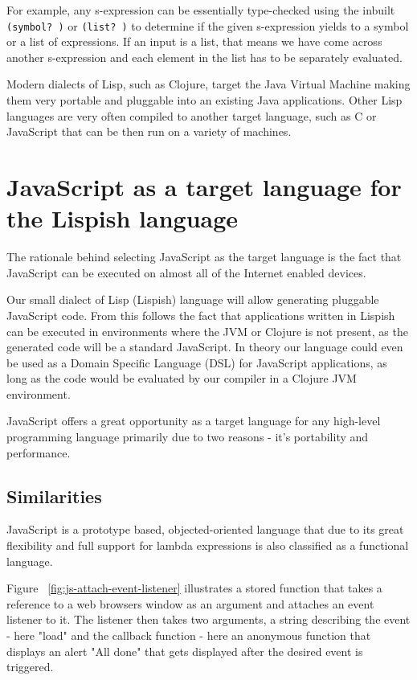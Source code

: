 For example, any s-expression can be essentially type-checked using the inbuilt \texttt{(symbol? )} or \texttt{(list? )} to determine if the given s-expression yields to a symbol or a list of expressions. If an input is a list, that means we have come across another s-expression and each element in the list has to be separately evaluated.

Modern dialects of Lisp, such as Clojure, target the Java Virtual Machine making them very portable and pluggable into an existing Java applications.
Other Lisp languages are very often compiled to another target language, such as C or JavaScript that can be then run on a variety of machines.

\section{JavaScript as a target language for the Lispish language}
The rationale behind selecting JavaScript as the target language is the fact that JavaScript can be executed on almost all of the Internet enabled devices.

Our small dialect of Lisp (Lispish) language will allow generating pluggable JavaScript code.
From this follows the fact that applications written in Lispish can be executed in environments where the JVM or Clojure is not present, as the generated code will be a standard JavaScript.
In theory our language could even be used as a Domain Specific Language (DSL) for JavaScript applications, as long as the code would be evaluated by our compiler in a Clojure JVM environment.

JavaScript offers a great opportunity as a target language for any high-level programming language primarily due to two reasons - it's portability and performance.

\subsection{Similarities}
JavaScript is a prototype based, objected-oriented language that due to its great flexibility and full support for lambda expressions is also classified as a functional language.



Figure ~\ref{fig:js-attach-event-listener}  illustrates a stored function that takes a reference to a web browsers window as an argument and attaches an event listener to it. The listener then takes two arguments, a string describing the event - here "load" and the callback function - here an anonymous function that displays an alert "All done" that gets displayed after the desired event is triggered.

